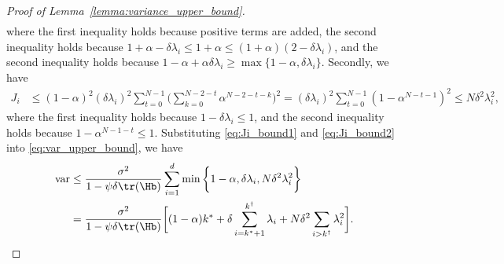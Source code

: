 \documentclass[11pt]{article}
\begin{document}
\begin{proof}[Proof of Lemma~\ref{lemma:variance_upper_bound}]
\begin{align}
\end{align}
where the first inequality holds because positive terms are added, the second inequality holds because $1+\alpha-\delta\lambda_i\le1+\alpha\le(1+\alpha)(2-\delta\lambda_i)$, and the second inequality holds because $1-\alpha+\alpha\delta\lambda_i\ge\max\{1-\alpha, \delta\lambda_i\}$.
Secondly, we have
\begin{align}\label{eq:Ji_bound2}
J_i&\le(1-\alpha)^2(\delta\lambda_i)^2\sum_{t=0}^{N-1}\bigg(\sum_{k=0}^{N-2-t}\alpha^{N-2-t-k}\bigg)^2=(\delta\lambda_i)^2\sum_{t=0}^{N-1}(1-\alpha^{N-t-1})^2\le N\delta^2\lambda_i^2,
\end{align}
where the first inequality holds because $1-\delta\lambda_i\le1$, and the second inequality holds because $1-\alpha^{N-1-t}\le1$. Substituting \eqref{eq:Ji_bound1} and \eqref{eq:Ji_bound2} into \eqref{eq:var_upper_bound}, we have
\begin{align*}
\mathrm{var}&\le\frac{\sigma^2}{1-\psi\delta\tr(\Hb)}\sum_{i=1}^d\min\bigg\{1-\alpha, \delta\lambda_i, N\delta^2\lambda_i^2\bigg\}\\
&=\frac{\sigma^2}{1-\psi\delta\tr(\Hb)}\bigg[(1-\alpha)k^*+\delta\sum_{i=k^*+1}^{k^\dagger}\lambda_i+N\delta^2\sum_{i>k^\dagger}\lambda_i^2\bigg].
\end{align*}
\end{proof}
\end{document}
